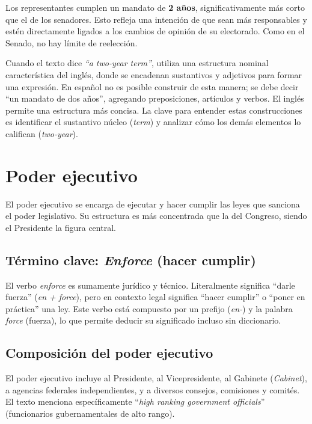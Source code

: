 \documentclass[12pt,oneside]{book}
\begin{document}
Los representantes cumplen un mandato de \textbf{2 años}, significativamente más corto que el de los senadores. Esto refleja una intención de que sean más responsables y estén directamente ligados a los cambios de opinión de su electorado. Como en el Senado, no hay límite de reelección.

\begin{note}
Cuando el texto dice \textit{``a two-year term''}, utiliza una estructura nominal característica del inglés, donde se encadenan sustantivos y adjetivos para formar una expresión. En español no es posible construir de esta manera; se debe decir ``un mandato de dos años'', agregando preposiciones, artículos y verbos. El inglés permite una estructura más concisa. La clave para entender estas construcciones es identificar el sustantivo núcleo (\textit{term}) y analizar cómo los demás elementos lo califican (\textit{two-year}).
\end{note}

\chapter{Poder ejecutivo}

El poder ejecutivo se encarga de ejecutar y hacer cumplir las leyes que sanciona el poder legislativo. Su estructura es más concentrada que la del Congreso, siendo el Presidente la figura central.

\section{Término clave: \textit{Enforce} (hacer cumplir)}

El verbo \textit{enforce} es sumamente jurídico y técnico. Literalmente significa ``darle fuerza'' (\textit{en + force}), pero en contexto legal significa ``hacer cumplir'' o ``poner en práctica'' una ley. Este verbo está compuesto por un prefijo (\textit{en-}) y la palabra \textit{force} (fuerza), lo que permite deducir su significado incluso sin diccionario.

\section{Composición del poder ejecutivo}

El poder ejecutivo incluye al Presidente, al Vicepresidente, al Gabinete (\textit{Cabinet}), a agencias federales independientes, y a diversos consejos, comisiones y comités. El texto menciona específicamente ``\textit{high ranking government officials}'' (funcionarios gubernamentales de alto rango).
\end{document}
